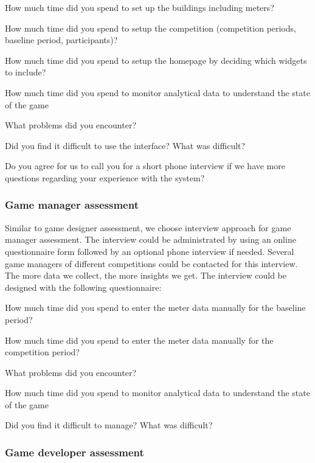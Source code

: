 \documentclass[11pt]{article}
\begin{document}
\begin{compactitem}
\item How much time did you spend to set up the buildings including meters?
\item How much time did you spend to setup the competition (competition periods, baseline period, participants)?
\item How much time did you spend to setup the homepage by deciding which widgets to include?
\item How much time did you spend to monitor analytical data to understand the state of the game
\item What problems did you encounter?
\item Did you find it difficult to use the interface? What was difficult?
\item Do you agree for us to call you for a short phone interview if we have more questions regarding your experience with the system?
\end{compactitem}
    
\subsubsection{Game manager assessment}

Similar to game designer assessment, we choose interview approach for game manager assessment. The interview could be administrated by using an online questionnaire form followed by an optional phone interview if needed. Several game managers of different competitions could be contacted for this interview. The more data we collect, the more insights we get. The interview could be designed with the following questionnaire: 

\begin{compactitem}
\item How much time did you spend to enter the meter data manually for the baseline period?
\item How much time did you spend to enter the meter data manually for the competition period?    
\item What problems did you encounter?
\item How much time did you spend to monitor analytical data to understand the state of the game
\item Did you find it difficult to manage? What was difficult?\\
\end{compactitem}
    
\subsubsection{Game developer assessment}
\end{document}
